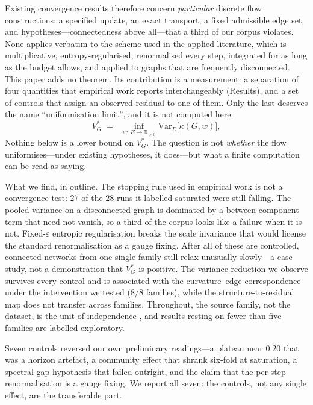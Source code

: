 \documentclass[11pt]{article}
\newcommand{\Var}{\mathrm{Var}}
\begin{document}
Existing convergence results therefore concern \emph{particular} discrete flow
constructions: a specified update, an exact transport, a fixed admissible edge
set, and hypotheses---connectedness above all---that a third of our corpus
violates. None applies verbatim to the scheme used in the applied literature,
which is multiplicative, entropy-regularised, renormalised every step,
integrated for as long as the budget allows, and applied to graphs that are
frequently disconnected. This paper adds no theorem. Its contribution is a
measurement: a separation of four quantities that empirical work reports
interchangeably (Results), and a set of controls that assign an observed
residual to one of them. Only the last deserves the name ``uniformisation
limit'', and it is not computed here:
\begin{equation}
  V_G^* \;=\; \; \inf_{w:\,E\to\mathbb{R}_{>0}} \Var_E\!\big[\kappa(G,w)\big],
  \label{eq:vstar}
\end{equation}
Nothing below is a lower bound on $V_G^*$. The question is not
\emph{whether} the flow uniformises---under existing hypotheses, it does---but
what a finite computation can be read as saying.

What we find, in outline. The stopping rule used in empirical work is not a
convergence test: $27$ of the $28$ runs it labelled saturated were still
falling. The
pooled variance on a disconnected graph is dominated by a between-component
term that need not vanish, so a third of the corpus looks like a failure when
it is not. Fixed-$\varepsilon$ entropic regularisation breaks the scale
invariance that would license the standard renormalisation as a gauge fixing.
After all of these are controlled, connected networks from one single family
still relax unusually slowly---a case study, not a demonstration that $V_G^*$
is positive. The variance reduction we observe survives every control and is
associated with the curvature--edge correspondence under the intervention we
tested ($8/8$ families), while the
structure-to-residual map does not transfer across families. Throughout, the
source family, not the dataset, is the unit of independence
\cite{CameronGelbachMiller2008,MacKinnonNielsenWebb2023}, and results resting
on fewer than five families are labelled exploratory.

Seven controls reversed our own preliminary readings---a plateau near $0.20$
that was a horizon artefact, a community effect that shrank six-fold at
saturation, a spectral-gap hypothesis that failed outright, and the claim that
the per-step renormalisation is a gauge fixing. We report all seven: the
controls, not any single effect, are the transferable part.
\end{document}
